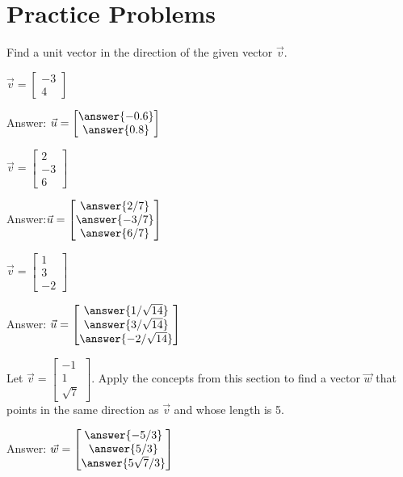 \documentclass{ximera}
\begin{document}
\section*{Practice Problems}
\begin{problem}
    Find a unit vector in the direction of the given vector $\vec{v}$.
  \begin{problem}\label{prob:00361}
  $\vec{v}=\begin{bmatrix}-3\\4\end{bmatrix}$
 
  Answer: $\vec{u}=\begin{bmatrix}\answer{-0.6}\\\answer{0.8}\end{bmatrix}$
  \end{problem}
  \begin{problem}\label{prob:00362}
      $\vec{v}=\begin{bmatrix}2\\-3\\6\end{bmatrix}$
 
Answer:$\vec{u}=\begin{bmatrix}\answer{2/7}\\\answer{-3/7}\\\answer{6/7}\end{bmatrix}$
   \end{problem}
   \begin{problem}\label{prob:00363}
        $\vec{v}=\begin{bmatrix}1\\3\\-2\end{bmatrix}$
 
 Answer: $\vec{u}=\begin{bmatrix}\answer{1/\sqrt{14}}\\\answer{3/\sqrt{14}}\\\answer{-2/\sqrt{14}}\end{bmatrix}$      
  \end{problem}
\end{problem} 
\begin{problem}\label{prob:00364}
Let $\vec{v}=\begin{bmatrix}-1\\1\\\sqrt{7}\end{bmatrix}$.
Apply the concepts from this section to find a vector $\vec{w}$ that points in the same direction as $\vec{v}$ and whose length is 5.
 
Answer: $\vec{w}=\begin{bmatrix}
    \answer{-5/3}\\\answer{5/3}\\\answer{5\sqrt{7}/3}
\end{bmatrix}$
\end{problem}
\end{document}
